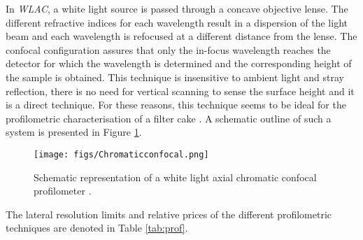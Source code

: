In \emph{\gls{WLAC}}, a white light source is passed through a concave objective lense. The different refractive indices for each wavelength result in a dispersion of the light beam and each wavelength is refocused at a different distance from the lense. The confocal configuration assures that only the in-focus wavelength reaches the detector for which the wavelength is determined and the corresponding height of the sample is obtained. This technique is insensitive to ambient light and stray reflection, there is no need for vertical scanning to sense the surface height and it is a direct technique. For these reasons, this technique seems to be ideal for the profilometric characterisation of a filter cake \citep{Leach2011,nanovea}. A schematic outline of such a system is presented in Figure \ref{wlccp}.   
\begin{figure}[]
\begin{center}
\hspace{-1.5cm}
\texttt{[image: figs/Chromaticconfocal.png]}
\caption{Schematic representation of a white light axial chromatic confocal profilometer \citep{nanovea}.} 
\label{wlccp}
\end{center}
\end{figure}
The lateral resolution limits and relative prices of the different profilometric techniques are denoted in Table \ref{tab:prof}.
